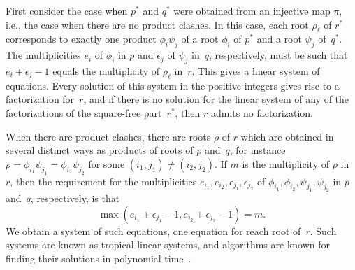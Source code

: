 \documentclass{sig-alternate}
\begin{document}
First consider the case when $p^\ast$ and $q^\ast$ were obtained from an injective
map $\pi$, i.e., the case when there are no product clashes. In this case, each
root $\rho_\ell$ of $r^\ast$ corresponds to exactly one product $\phi_i\psi_j$
of a root $\phi_i$ of $p^\ast$ and a root $\psi_j$ of~$q^\ast$. The
multiplicities $e_i$ of $\phi_i$ in $p$ and $\epsilon_j$ of $\psi_j$ in~$q$,
respectively, must be such that $e_i+\epsilon_j-1$ equals the
multiplicity of $\rho_\ell$ in~$r$. This gives a linear system of equations.
Every solution of this system in the positive integers gives rise to a
factorization for~$r$, and if there is no solution for the linear system of
any of the factorizations of the square-free part~$r^\ast$, then $r$ admits no factorization.

When there are product clashes, there are roots $\rho$ of $r$ which are obtained
in several distinct ways as products of roots of $p$ and~$q$, for instance
$\rho=\phi_{i_1}\psi_{j_1}=\phi_{i_2}\psi_{j_2}$ for some
$(i_1,j_1)\neq(i_2,j_2)$.  If $m$ is the multiplicity of $\rho$ in~$r$, then the
requirement for the multiplicities
$e_{i_1},e_{i_2},\epsilon_{j_1},\epsilon_{j_2}$ of
$\phi_{i_1},\phi_{i_2},\psi_{j_1},\psi_{j_2}$ in $p$ and~$q$, respectively, is
that
\[
\max(e_{i_1}+\epsilon_{j_1}-1,e_{i_2}+\epsilon_{j_2}-1)=m.
\]
We obtain a
system of such equations, one equation for reach root of~$r$.  Such systems are
known as tropical linear systems, and algorithms are known for finding their
solutions in polynomial time~\cite{grigoriev13}.
\end{document}
